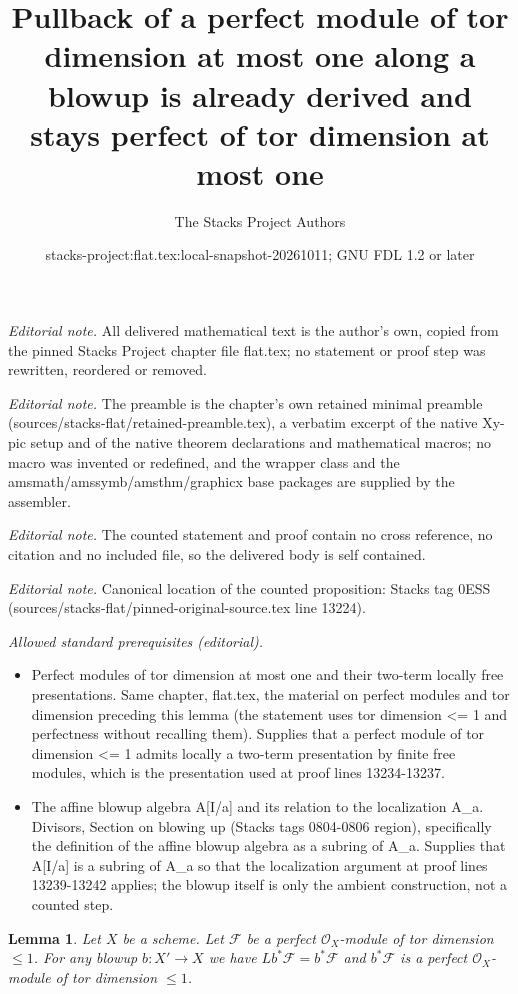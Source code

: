 \documentclass[10pt,a4paper]{amsart}
\title{Pullback of a perfect module of tor dimension at most one along a blowup is already derived and stays perfect of tor dimension at most one}
\author{The Stacks Project Authors}
\date{stacks-project:flat.tex:local-snapshot-20261011; GNU FDL 1.2 or later}
\theoremstyle{plain}
\newtheorem{lemma}[subsection]{Lemma}
\theoremstyle{definition}
\theoremstyle{remark}
\numberwithin{equation}{subsection}
\begin{document}
\maketitle
\noindent\textit{Editorial note.} All delivered mathematical text is the author's own, copied from the pinned Stacks Project chapter file flat.tex; no statement or proof step was rewritten, reordered or removed.\par\medskip
\noindent\textit{Editorial note.} The preamble is the chapter's own retained minimal preamble (sources/stacks-flat/retained-preamble.tex), a verbatim excerpt of the native Xy-pic setup and of the native theorem declarations and mathematical macros; no macro was invented or redefined, and the wrapper class and the amsmath/amssymb/amsthm/graphicx base packages are supplied by the assembler.\par\medskip
\noindent\textit{Editorial note.} The counted statement and proof contain no cross reference, no citation and no included file, so the delivered body is self contained.\par\medskip
\noindent\textit{Editorial note.} Canonical location of the counted proposition: Stacks tag 0ESS (sources/stacks-flat/pinned-original-source.tex line 13224).\par\medskip
\noindent\textit{Allowed standard prerequisites (editorial).}\begin{itemize}
\item Perfect modules of tor dimension at most one and their two-term locally free presentations. Same chapter, flat.tex, the material on perfect modules and tor dimension preceding this lemma (the statement uses tor dimension <= 1 and perfectness without recalling them). Supplies that a perfect module of tor dimension <= 1 admits locally a two-term presentation by finite free modules, which is the presentation used at proof lines 13234-13237.
\item The affine blowup algebra A[I/a] and its relation to the localization A\_a. Divisors, Section on blowing up (Stacks tags 0804-0806 region), specifically the definition of the affine blowup algebra as a subring of A\_a. Supplies that A[I/a] is a subring of A\_a so that the localization argument at proof lines 13239-13242 applies; the blowup itself is only the ambient construction, not a counted step.
\end{itemize}\medskip
\begin{lemma}
\label{lemma-blowup-pd1-derived}
Let $X$ be a scheme. Let $\mathcal{F}$ be a perfect
$\mathcal{O}_X$-module of tor dimension $\leq 1$. For any
blowup $b : X' \to X$ we have $Lb^*\mathcal{F} = b^*\mathcal{F}$
and $b^*\mathcal{F}$ is a perfect $\mathcal{O}_X$-module
of tor dimension $\leq 1$.
\end{lemma}
\end{document}
